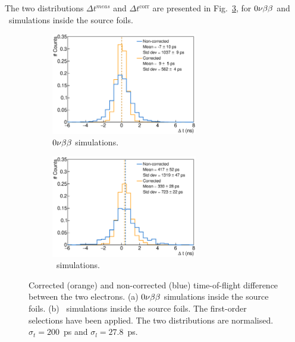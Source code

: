 The two distributions $\Delta t^{meas}$ and $\Delta t^{\text{corr}}$ are presented in Fig.~\ref{fig:delta_t}, for $0\nu\beta\beta$ and \Tl\ simulations inside the source foils.
\begin{figure}[!h]
\centering
\begin{subfigure}[t]{1.\textwidth}
  \centering
  \includegraphics[width=0.7\textwidth]{timedifference/fig_timediff/0nubb_delta_t.eps}
  \captionsetup{justification=justified}
  \caption{$0\nu\beta\beta$ simulations.
    \label{subfig:0nubb_delta_t}}
\end{subfigure}
\hfill
\begin{subfigure}[t]{1.\textwidth}
  \centering
  \includegraphics[width=0.7\textwidth]{timedifference/fig_timediff/208Tl_delta_t.eps}
  \captionsetup{justification=justified}
  \caption{\Tl\ simulations.
    \label{subfig:208Tl_delta_t}}
\end{subfigure}
\caption{Corrected (orange) and non-corrected (blue) time-of-flight difference between the two electrons.
  (a) $0\nu\beta\beta$ simulations inside the source foils.
  (b) \Tl\ simulations inside the source foils.
  The first-order selections have been applied.
  The two distributions are normalised.
  $\sigma_{t}=200$~ps and $\sigma_{l}=27.8$~ps.
  \label{fig:delta_t}}
\end{figure}
